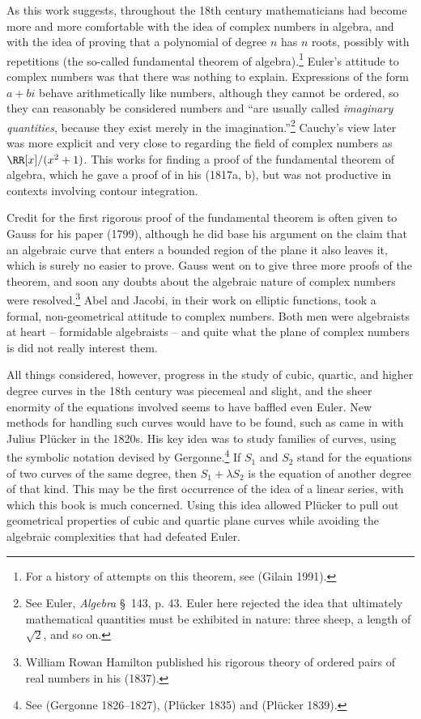 As this work suggests, throughout the 18th century mathematicians had become more and more comfortable with the idea of complex numbers in algebra, and with the idea of proving that a polynomial of degree $n$ has $n$ roots, possibly with repetitions (the so-called fundamental theorem of algebra).\footnote{For a history of attempts on this theorem, see (Gilain 1991).} Euler's attitude to complex numbers was that there was nothing to explain. Expressions of the form $a+bi$  behave arithmetically like numbers, although they cannot be ordered, so they can reasonably be considered numbers  and ``are usually called \emph{imaginary quantities}, because they exist merely in the imagination.''\footnote{See Euler, \emph{Algebra} \S\, 143, p. 43. Euler here rejected the idea that ultimately mathematical quantities must be exhibited in nature: three sheep, a length of $\sqrt{2}$, and so on.} Cauchy's view later was more explicit and very close to regarding  the field of complex numbers as $\RR[x]/(x^2 + 1)$. This works for finding a proof of the fundamental theorem of algebra, which he gave a proof of in his (1817a, b), but was not productive in contexts involving contour integration. 

Credit for the first rigorous proof of the fundamental theorem is often given to Gauss for his paper (1799), although he did base his argument on the claim that an algebraic curve that enters a bounded region of the plane it also leaves it,  which is surely no easier to prove.  Gauss went on to give three more proofs of the theorem, and soon any doubts about the algebraic nature of complex numbers were resolved.\footnote{William Rowan Hamilton published his rigorous theory of ordered pairs of real numbers in his (1837).} Abel and Jacobi, in their work  on elliptic functions, took a formal, non-geometrical attitude to complex numbers.  Both men were algebraists at heart -- formidable algebraists -- and quite what the plane of complex numbers is did not really interest them. 

All things considered, however, progress in the study of cubic, quartic, and higher degree curves in the 18th century was piecemeal and slight, and the sheer enormity of the equations involved seems to have baffled even Euler. New methods for handling such curves would have to be found, such as came in with Julius Pl\"ucker in the 1820s. His key idea was to study families of curves, using the symbolic notation devised by Gergonne.\footnote{See  (Gergonne 1826--1827), (Pl\"ucker 1835) and (Pl\"ucker 1839).} If $S_1$ and $S_2$ stand for the equations of two curves of the same degree, then $S_1 + \lambda S_2$ is the equation of another degree of that kind. This may be the first occurrence of the idea of a linear series, with which this book is much concerned. Using this idea allowed Pl\"ucker to pull out geometrical properties of cubic and quartic plane curves while avoiding the algebraic complexities that had defeated Euler.  

